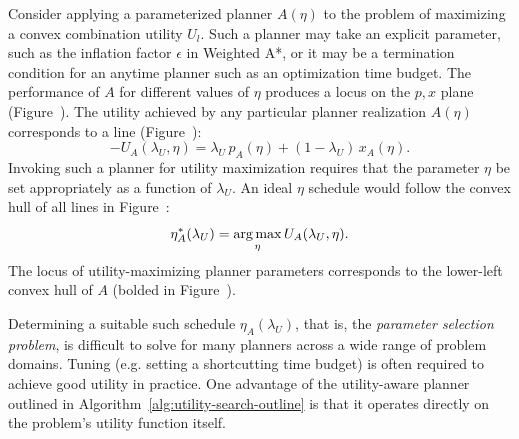 Consider applying a parameterized planner $A(\eta)$
to the problem of maximizing a convex combination utility $U_l$.
Such a planner may take an explicit parameter,
such as the inflation factor $\epsilon$ in Weighted A*,
or it may be a termination condition for an anytime planner
such as an optimization time budget.
The performance of $A$ for different values of $\eta$ 
produces a locus on the $p,x$ plane
(Figure~).
The utility achieved by any particular planner realization $A(\eta)$
corresponds to a line (Figure~):
\begin{equation}
   - U_A(\lambda_U,\eta)
   = \lambda_U \, p_A(\eta)
   + (1\!-\!\lambda_U) \, x_A(\eta).
\end{equation}
Invoking such a planner for utility maximization
requires that the parameter $\eta$ be set appropriately
as a function of $\lambda_U$.
An ideal $\eta$ schedule would follow the convex hull of all
lines in Figure~:
\begin{equation}
   \eta^*_A(\lambda_U) = \operatorname*{arg\,max}_{\eta} U_A(\lambda_U,\eta).
   \label{eqn:oracle-param-schedule}
\end{equation}
The locus of utility-maximizing planner parameters
corresponds to the lower-left convex hull of $A$
(bolded in Figure~).

Determining a suitable such schedule
$\eta_A(\lambda_U)$,
that is, the \emph{parameter selection problem},
is difficult to solve for many planners across a wide range of
problem domains.
Tuning (e.g. setting a shortcutting time budget)
is often required to achieve good utility in practice.
One advantage of the utility-aware planner outlined in
Algorithm~\ref{alg:utility-search-outline}
is that it operates directly on the problem's utility function itself.

